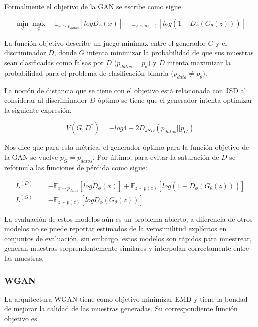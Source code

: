 Formalmente el objetivo de la GAN se escribe como sigue.

\begin{equation}
	\underset{\theta}{\min}\underset{\phi}{\max} \quad \mathbb{E}_{x \sim  p_{datos}}\left[ logD_\phi (x) \right] + \mathbb{E}_{z\sim p(z)}\left[ log( 1 - D_\phi ( G_\theta (z) ) )\right]
\end{equation}

La función objetivo describe un juego minimax entre el generador $G$ y el discriminador $D$, donde $G$ intenta minimizar la probabilidad de que sus muestras sean clasificadas como falsas por $D$ ($p_{datos} = p_\theta $)  y $D$ intenta maximizar la probabilidad para el problema de clasificación binaria ($p_{data} \neq p_\theta$).

La noción de distancia que se tiene con el objetivo está relacionada con JSD al considerar al discriminador $D$ óptimo se tiene que el generador intenta optimizar la siguiente expresión.

\begin{equation}
	V(G, D^{*}) =  -log4 + 2D_{JSD}(p_{datos}||p_{G})
\end{equation}

Nos dice que para esta métrica, el generador óptimo para la función objetivo de la GAN se vuelve $p_G = p_{datos}$. Por último, para evitar la saturación de $D$ se reformula las funciones de pérdida como sigue: 

\begin{align}
	L^{(D)} &= - \mathbb{E}_{x \sim  p_{datos}}\left[ logD_\phi (x) \right] + \mathbb{E}_{z\sim p(z)}\left[ log( 1 - D_\phi ( G_\theta (z) ) )\right]\\
	L^{(G)} &= - \mathbb{E}_{z \sim  p(z)} \left[ logD_\phi ( G_\theta (z) )\right]
\end{align}

La evaluación de estos modelos aún es un problema abierto, a diferencia de otros modelos no se puede reportar estimados de la verosimilitud explícitos en conjuntos de evaluación, sin embargo, estos modelos son rápidos para muestrear, generan muestras sorprendentemente similares y interpolan correctamente entre las muestras.

\subsubsection{WGAN}

La arquitectura WGAN tiene como objetivo minimizar EMD y tiene la bondad de mejorar la calidad de las muestras generadas. Su correspondiente función objetivo es.

